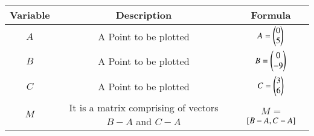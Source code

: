 \begin{center}
    \begin{tabular}{|c|c|c|} 
        \hline
            \textbf{Variable} & \textbf{Description} & \textbf{Formula} \\ 
        \hline
            $A$   & A Point to be plotted & $A = \begin{pmatrix}0 \\ 5\end{pmatrix}$ \\ 
        \hline
            $B$   &  A Point to be plotted &  $B = \begin{pmatrix}0 \\ -9\end{pmatrix}$\\ 
        \hline
            $C$   & A Point to be plotted & $C  = \begin{pmatrix}3\\6\end{pmatrix}$\\ 
        \hline
            $M$   & It is a matrix comprising of vectors $B-A$ and $C-A$ & $M$ = \textbf{${}\left[B-A,C-A\right]$}\\ 
        \hline
    \end{tabular}
\end{center}  




